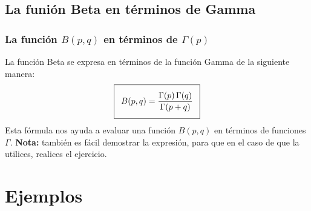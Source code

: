 \documentclass[12pt]{beamer}
\begin{document}
\subsection{La funión Beta en términos de Gamma}
\begin{frame}
\frametitle{La función $B(p, q)$ en términos de $\Gamma (p)$}
La función Beta se expresa en términos de la función Gamma de la siguiente manera:
\begin{align}
\addtolength{\fboxsep}{5pt}\boxed{B(p, q) = \dfrac{\Gamma(p) \, \Gamma(q)}{\Gamma (p + q)}}
\label{eq:ecuacion_07_01}
\end{align}
Esta fórmula nos ayuda a evaluar una función $B (p, q)$ en términos de funciones $\Gamma$. \textbf{Nota: } también es fácil demostrar la expresión, para que en el caso de que la utilices, realices el ejercicio.
\end{frame}
\section{Ejemplos}
\end{document}
